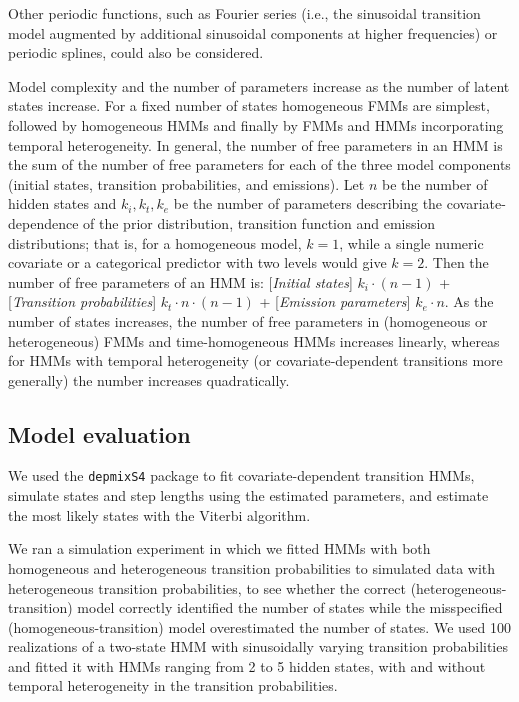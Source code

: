 \documentclass{bmcart}
\begin{document}
Other periodic functions, such as Fourier series (i.e., the sinusoidal transition model augmented by additional sinusoidal components at higher frequencies) or periodic splines, could also be considered.

Model complexity and the number of parameters increase as the number of latent states increase.
For a fixed number of states homogeneous FMMs are simplest, followed by homogeneous HMMs and finally by FMMs and HMMs incorporating temporal heterogeneity. In general, the number of free parameters in an HMM is the sum of the number of free parameters for each of the three model components (initial states, transition probabilities, and emissions). Let $n$ be the number of hidden states and $k_{i}, k_{t}, k_{e}$ be the number of parameters describing the covariate-dependence of the prior distribution, transition function and emission distributions; that is, for a homogeneous model, $k=1$, while a single numeric covariate or a categorical predictor with two levels would give $k=2$. Then the number of free parameters of an HMM is:
[\emph{Initial states}] $k_{i}\cdot (n-1)$ 
+ [\emph{Transition probabilities}] $k_{t}\cdot n\cdot (n-1)$ 
+ [\emph{Emission parameters}] $k_{e}\cdot n$.
As the number of states increases, the number of free parameters in (homogeneous or heterogeneous) FMMs and time-homogeneous HMMs increases linearly, whereas for HMMs with temporal heterogeneity (or covariate-dependent transitions more generally) the number increases quadratically.

\subsection*{Model evaluation}

We used the {\tt depmixS4} package \cite{visser2010depmixs4}
to fit covariate-dependent transition HMMs, 
simulate states and step lengths using the
estimated parameters, and estimate the most likely
states with the Viterbi
algorithm.

We ran a simulation experiment in which we fitted HMMs with
both homogeneous and heterogeneous 
transition probabilities to simulated data with
heterogeneous transition probabilities, to see whether
the correct (heterogeneous-transition) model correctly
identified the number of states while the misspecified
(homogeneous-transition) model overestimated the number of states.
We used 100 realizations of a two-state HMM with sinusoidally varying
transition probabilities and fitted it with HMMs ranging from
2 to 5 hidden states, with and
without temporal heterogeneity in the transition probabilities.
\end{document}
